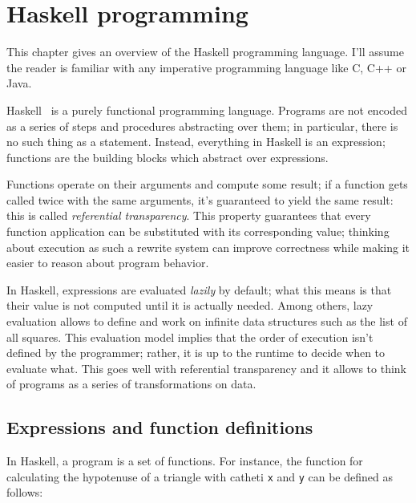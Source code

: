 \documentclass[UdineBachThesis,american,11pt]{PhdThesis}
\begin{document}
  \frontmatter

  \tableofcontents

  \mainmatter

  \pagestyle{serif}

  \chapter{Haskell programming}

  This chapter gives an overview of the Haskell programming language. I'll
  assume the reader is familiar with any imperative programming language like C,
  C++ or Java.

  Haskell~\autocite{haskell} is a purely functional programming language.
  Programs are not encoded as a series of steps and procedures abstracting over
  them; in particular, there is no such thing as a statement. Instead,
  everything in Haskell is an expression; functions are the building blocks
  which abstract over expressions.

  Functions operate on their arguments and compute some result; if a function
  gets called twice with the same arguments, it's guaranteed to yield the same
  result: this is called \emph{referential transparency}. This property
  guarantees that every function application can be substituted with its
  corresponding value; thinking about execution as such a rewrite system can
  improve correctness while making it easier to reason about program behavior.

  In Haskell, expressions are evaluated \emph{lazily} by default; what this
  means is that their value is not computed until it is actually needed. Among
  others, lazy evaluation allows to define and work on infinite data structures
  such as the list of all squares. This evaluation model implies that the order
  of execution isn't defined by the programmer; rather, it is up to the runtime
  to decide when to evaluate what. This goes well with referential transparency
  and it allows to think of programs as a series of transformations on data.

  \section{Expressions and function definitions}

  In Haskell, a program is a set of functions. For instance, the function for
  calculating the hypotenuse of a triangle with catheti \texttt{x} and
  \texttt{y} can be defined as follows:
\end{document}
